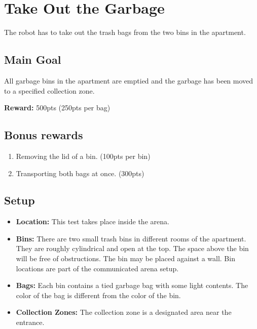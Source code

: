 \section{Take Out the Garbage}
\enlargethispage{\baselineskip} %
The robot has to take out the trash bags from the two bins in the apartment.


\subsection{Main Goal}
All garbage bins in the apartment are emptied and the garbage has been moved to a specified collection zone.

\noindent\textbf{Reward:} 500pts (250pts per bag)

\subsection{Bonus rewards}
\begin{enumerate}[nosep]
	\item Removing the lid of a bin. (100pts per bin) 
	\item Transporting both bags at once. (300pts)
\end{enumerate}

\subsection{Setup}
\begin{itemize}[nosep]
	\item \textbf{Location:} This test takes place inside the arena.
	\item \textbf{Bins:} There are two small trash bins in different rooms of the apartment. They are roughly cylindrical and open at the top. The space above the bin will be free of obstructions. The bin may be placed against a wall. Bin locations are part of the communicated arena setup.
	\item \textbf{Bags:} Each bin contains a tied garbage bag with some light contents. The color of the bag is different from the color of the bin.
	\item \textbf{Collection Zones:} The collection zone is a designated area near the entrance. 
\end{itemize}


